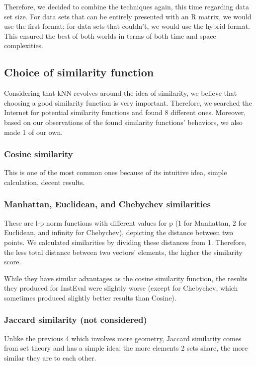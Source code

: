\documentclass{article}
\begin{document}
Therefore, we decided to combine the techniques again, this time regarding data set size. For data sets that can be entirely presented with an R matrix, we would use the first format; for data sets that couldn't, we would use the hybrid format. This ensured the best of both worlds in terms of both time and space complexities.

\subsection{Choice of similarity function}

Considering that kNN revolves around the idea of similarity, we believe that choosing a good similarity function is very important. Therefore, we searched the Internet for potential similarity functions and found 8 different ones. Moreover, based on our observations of the found similarity functions' behaviors, we also made 1 of our own.

\subsubsection{Cosine similarity}

This is one of the most common ones because of its intuitive idea, simple calculation, decent results.

\subsubsection{Manhattan, Euclidean, and Chebychev similarities}

These are l-p norm functions with different values for p (1 for Manhattan, 2 for Euclidean, and infinity for Chebychev), depicting the distance between two points. We calculated similarities by dividing these distances from 1. Therefore, the less total distance between two vectors' elements, the higher the similarity score. 

While they have similar advantages as the cosine similarity function, the results they produced for InstEval were slightly worse (except for Chebychev, which sometimes produced slightly better results than Cosine).

\subsubsection{Jaccard similarity (not considered)}

Unlike the previous 4 which involves more geometry, Jaccard similarity comes from set theory and has a simple idea: the more elements 2 sets share, the more similar they are to each other. 
\end{document}

